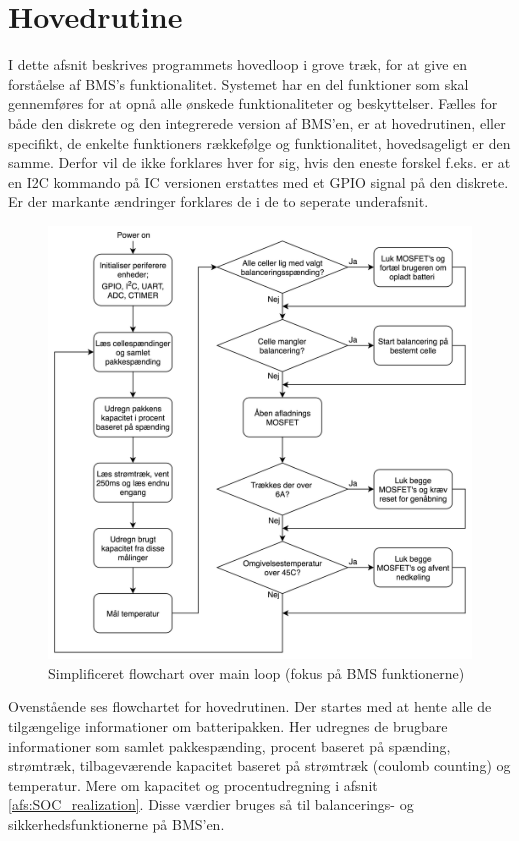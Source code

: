 \section{Hovedrutine}
I dette afsnit beskrives programmets hovedloop i grove træk, for at give en forståelse af BMS's funktionalitet. Systemet har en del funktioner som skal gennemføres for at opnå alle ønskede funktionaliteter og beskyttelser. Fælles for både den diskrete og den integrerede version af BMS'en, er at hovedrutinen, eller specifikt, de enkelte funktioners rækkefølge og funktionalitet, hovedsageligt er den samme. Derfor vil de ikke forklares hver for sig, hvis den eneste forskel f.eks. er at en I2C kommando på IC versionen erstattes med et GPIO signal på den diskrete. Er der markante ændringer forklares de i de to seperate underafsnit.

\begin{figure}[h]
	\centering
	\includegraphics[width=15cm]{billeder/main_loop_bms_functions.png}
	\caption{Simplificeret flowchart over main loop (fokus på BMS funktionerne)}
	\label{fig:main_loop}
\end{figure}

Ovenstående ses flowchartet for hovedrutinen. Der startes med at hente alle de tilgængelige informationer om batteripakken. Her udregnes de brugbare informationer som samlet pakkespænding, procent baseret på spænding, strømtræk, tilbageværende kapacitet baseret på strømtræk (coulomb counting) og temperatur. Mere om kapacitet og procentudregning i afsnit \ref{afs:SOC_realization}. Disse værdier bruges så til balancerings- og sikkerhedsfunktionerne på BMS'en. \\

